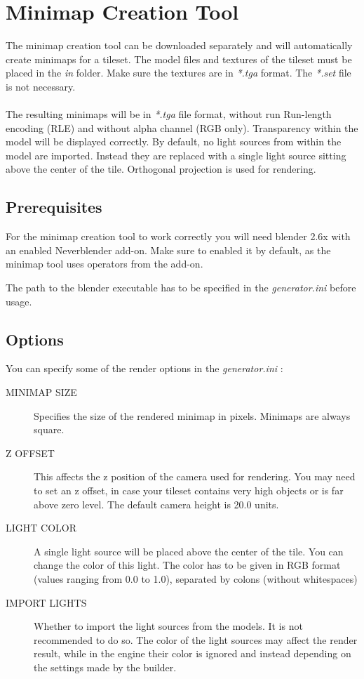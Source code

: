 \documentclass[a4paper]{article}
\begin{document}
\section{Minimap Creation Tool}
The minimap creation tool can be downloaded separately and will automatically create minimaps for a tileset. The model files and textures of the tileset must be placed in the {\textit{in}}  folder. Make sure the textures are in {\textit{*.tga}} format. The {\textit{*.set}} file is not necessary. \\ \\
The resulting minimaps will be in {\textit{*.tga}} file format, without run Run-length encoding (RLE) and without alpha channel (RGB only). Transparency within the model will be displayed correctly. By default, no light sources from within the model are imported. Instead they are replaced with a single light source sitting above the center of the tile. Orthogonal projection is used for rendering.

\subsection{Prerequisites}
For the minimap creation tool to work correctly you will need blender 2.6x with an enabled Neverblender add-on. Make sure to enabled it by default, as the minimap tool uses operators from the add-on.

The path to the blender executable has to be specified in the {\textit{generator.ini}} before usage.

\subsection{Options}
You can specify some of the render options in the {\textit{generator.ini}} :
\begin{description}
\item[MINIMAP SIZE] Specifies the size of the rendered minimap in pixels. Minimaps are always square.
\item[Z OFFSET] This affects the z position of the camera used for rendering. You may need to set an z offset, in case your tileset contains very high objects or is far above zero level. The default camera height is 20.0 units.
\item[LIGHT COLOR] A single light source will be placed above the center of the tile. 
You can change the color of this light. The color has to be given in RGB format (values ranging from 0.0 to 1.0), separated by colons (without whitespaces)
\item[IMPORT LIGHTS] Whether to import the light sources from the models. It is not recommended
to do so. The color of the light sources may affect the render result, while in the engine their color is ignored and instead depending on the settings made by the builder.
\end{description}
\end{document}
